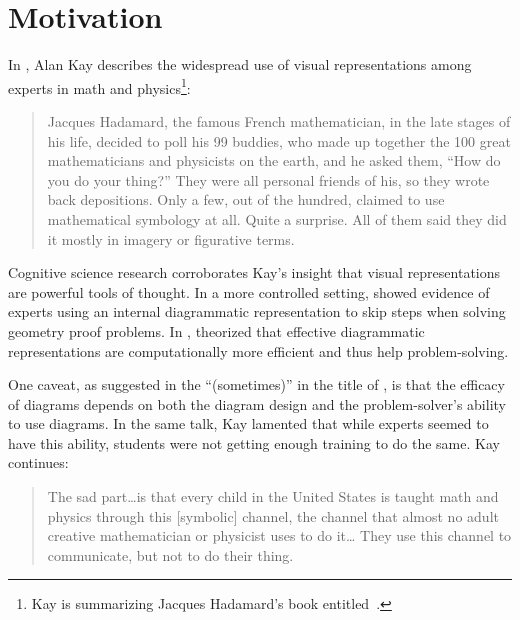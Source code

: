 \section{Motivation}
\label{sec:motivation}

In , Alan Kay describes the widespread use of visual representations among experts in math and physics\footnote{Kay is summarizing Jacques Hadamard's book entitled~\cite{hadamard_mathematicians_1945}.}:

\begin{quote}
Jacques Hadamard, the famous French mathematician, in the late stages of his life, decided to poll his 99 buddies, who made up together the 100 great mathematicians and physicists on the earth, and he asked them, ``How do you do your thing?'' They were all personal friends of his, so they wrote back depositions. Only a few, out of the hundred, claimed to use mathematical symbology at all. Quite a surprise. All of them said they did it mostly in imagery or figurative terms.\cite{doingWithImages}
\end{quote}

\noindent Cognitive science research corroborates Kay's insight that visual representations are powerful tools of thought. In a more controlled setting,  \citet{perceptualChunks} showed evidence of experts using an internal diagrammatic representation to skip steps when solving geometry proof problems. In , \citet{whyDiagramWorth} theorized that effective diagrammatic representations are computationally more efficient and thus help problem-solving.

One caveat, as suggested in the ``(sometimes)'' in the title of \cite{whyDiagramWorth}, is that the efficacy of diagrams depends on both the diagram design and the problem-solver's ability to use diagrams. In the same talk, Kay lamented that while experts seemed to have this ability, students were not getting enough training to do the same.  Kay continues:

\begin{quote}
    The sad part\dots{}is that every child in the United States is taught math and physics through this [symbolic] channel, the channel that almost no adult creative mathematician or physicist uses to do it\dots{} They use this channel to communicate, but not to do their thing.\cite{doingWithImages}
\end{quote}

